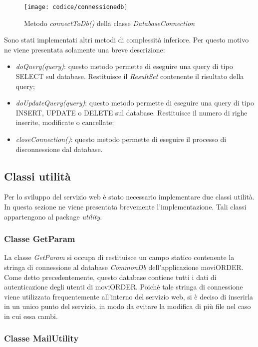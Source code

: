 \begin{figure}[!h] 
    \centering 
    \texttt{[image: codice/connessionedb]} 
    \caption{Metodo \textit{connectToDb()} della classe \textit{DatabaseConnection}}
\end{figure}


Sono stati implementati altri metodi di complessità inferiore. Per questo motivo ne viene presentata solamente una breve descrizione:
\begin{itemize}
	\item \textit{doQuery(query)}: questo metodo permette di eseguire una query di tipo SELECT sul database. Restituisce il \textit{ResultSet} contenente il risultato della query;
	\item \textit{doUpdateQuery(query)}: questo metodo permette di eseguire una query di tipo INSERT, UPDATE o DELETE sul database. Restituisce il numero di righe inserite, modificate o cancellate;
	\item \textit{closeConnection()}: questo metodo permette di eseguire il processo di disconnessione dal database.
\end{itemize}

\subsection{Classi utilità}

Per lo sviluppo del servizio web è stato necessario implementare due classi utilità. In questa sezione ne viene presentata brevemente l'implementazione. Tali classi appartengono al package \textit{utility}.

\subsubsection{Classe GetParam}

La classe \textit{GetParam} si occupa di restituisce un campo statico contenente la stringa di connessione al database \textit{CommonDb} dell'applicazione moviORDER. Come detto precedentemente, questo database contiene tutti i dati di autenticazione degli utenti di moviORDER. Poiché tale stringa di connessione viene utilizzata frequentemente all'interno del servizio web, si è deciso di inserirla in un unico punto del servizio, in modo da evitare la modifica di più file nel caso in cui essa cambi.

\subsubsection{Classe MailUtility}

